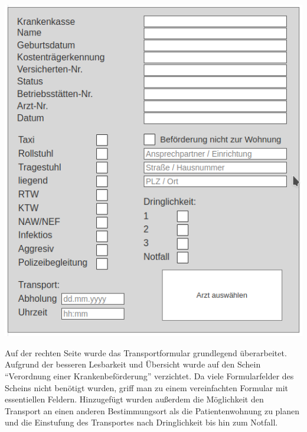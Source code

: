 \documentclass[a4paper, ngerman, 12pt]{scrartcl}
\begin{document}
\begin{center}
\begin{minipage}{0.8\textwidth}
	\centering
	\includegraphics[width=\textwidth]{Bilder/form.png}
	\label{img:form}
\end{minipage}
\end{center}
Auf der rechten Seite wurde das Transportformular grundlegend überarbeitet. Aufgrund der besseren Lesbarkeit und Übersicht wurde auf den Schein ``Verordnung einer Krankenbeförderung'' verzichtet. Da viele Formularfelder des Scheins nicht benötigt wurden, griff man zu einem vereinfachten Formular mit essentiellen Feldern. Hinzugefügt wurden außerdem die Möglichkeit den Transport an einen anderen Bestimmungsort als die Patientenwohnung zu planen und die Einstufung des Transportes nach Dringlichkeit bis hin zum Notfall.\\
\end{document}
